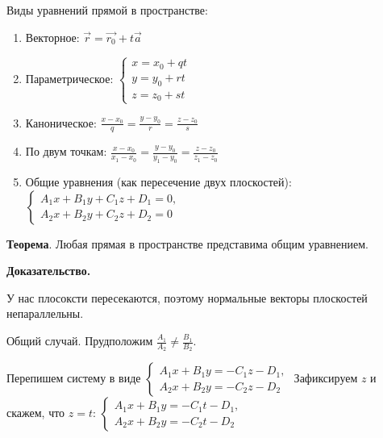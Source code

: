 \documentclass[a4paper]{article}
\begin{document}
Виды уравнений прямой в пространстве:
\begin{enumerate}
\item Векторное: $\vec{r} = \vec{r_0} + t\vec{a}$
\item Параметрическое: $\begin{cases}
   x=x_0+qt
   \\
   y=y_0+rt
   \\
   z=z_0+st
 \end{cases}$
\item Каноническое: $\displaystyle \frac{x-x_0}{q} = \frac{y-y_0}{r} = \frac{z-z_0}{s}$
\item По двум точкам: $\displaystyle \frac{x-x_0}{x_1-x_0} = \frac{y-y_0}{y_1-y_0} = \frac{z-z_0}{z_1-z_0}$
\item Общие уравнения (как пересечение двух плоскостей): $\begin{cases}
A_1x+B_1y+C_1z+D_1=0,
\\
A_2x+B_2y+C_2z+D_2=0
\end{cases}$
\end{enumerate}

\textbf{Теорема}. Любая прямая в пространстве представима общим уравнением.

\textbf{Доказательство.} 

У нас плосоксти пересекаются, поэтому нормальные векторы плоскостей непараллельны.

Общий случай. Прудположим $\displaystyle \frac{A_1}{A_2} \neq \frac{B_1}{B_2}$.
 
 Перепишем систему в виде $\begin{cases}
 A_1x+B_1y=-C_1z-D_1,
 \\
 A_2x+B_2y=-C_2z-D_2
 \end{cases}
$ Зафиксируем $z$ и скажем, что $z=t$: $\displaystyle \begin{cases}
 A_1x+B_1y=-C_1t-D_1,
 \\
 A_2x+B_2y=-C_2t-D_2
 \end{cases}
$
\end{document}
